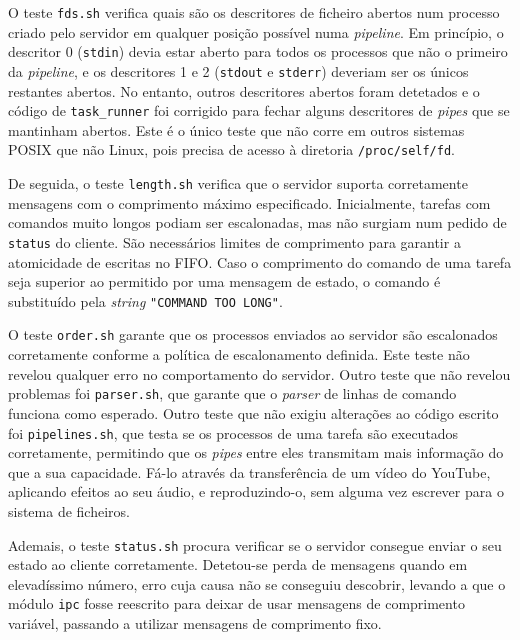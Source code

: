 \documentclass[11pt]{article}
\begin{document}
O teste \texttt{fds.sh} verifica quais são os descritores de ficheiro abertos num processo criado
pelo servidor em qualquer posição possível numa \emph{pipeline}. Em princípio, o descritor 0
(\texttt{stdin}) devia estar aberto para todos os processos que não o primeiro da \emph{pipeline}, e
os descritores 1 e 2 (\texttt{stdout} e \texttt{stderr}) deveriam ser os únicos restantes abertos.
No entanto, outros descritores abertos foram detetados e o código de \texttt{task\_runner} foi
corrigido para fechar alguns descritores de \emph{pipes} que se mantinham abertos. Este é o único
teste que não corre em outros sistemas POSIX que não Linux, pois precisa de acesso à diretoria
\texttt{/proc/self/fd}.

De seguida, o teste \texttt{length.sh} verifica que o servidor suporta corretamente mensagens com o
comprimento máximo especificado. Inicialmente, tarefas com comandos muito longos podiam ser
escalonadas, mas não surgiam num pedido de \texttt{status} do cliente. São necessários limites de
comprimento para garantir a atomicidade de escritas no FIFO. Caso o comprimento do comando de uma
tarefa seja superior ao permitido por uma mensagem de estado, o comando é substituído pela
\emph{string} \texttt{"COMMAND TOO LONG"}.

O teste \texttt{order.sh} garante que os processos enviados ao servidor são escalonados corretamente
conforme a política de escalonamento definida. Este teste não revelou qualquer erro no comportamento
do servidor. Outro teste que não revelou problemas foi \texttt{parser.sh}, que garante que o
\emph{parser} de linhas de comando funciona como esperado. Outro teste que não exigiu alterações ao
código escrito foi \texttt{pipelines.sh}, que testa se os processos de uma tarefa são executados
corretamente, permitindo que os \emph{pipes} entre eles transmitam mais informação do que a sua
capacidade. Fá-lo através da transferência de um vídeo do YouTube, aplicando efeitos ao seu áudio, e
reproduzindo-o, sem alguma vez escrever para o sistema de ficheiros.

Ademais, o teste \texttt{status.sh} procura verificar se o servidor consegue enviar o seu estado ao
cliente corretamente. Detetou-se perda de mensagens quando em elevadíssimo número, erro cuja causa
não se conseguiu descobrir, levando a que o módulo \texttt{ipc} fosse reescrito para deixar de usar
mensagens de comprimento variável, passando a utilizar mensagens de comprimento fixo.
\end{document}
